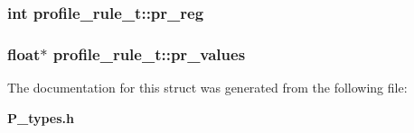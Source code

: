 \subsubsection{\setlength{\rightskip}{0pt plus 5cm}int profile\_\-rule\_\-t::pr\_\-reg}\label{structprofile__rule__t_m1}


\subsubsection{\setlength{\rightskip}{0pt plus 5cm}float$\ast$ profile\_\-rule\_\-t::pr\_\-values}\label{structprofile__rule__t_m3}




The documentation for this struct was generated from the following file:\begin{CompactItemize}
\item 
{\bf P\_\-types.h}\end{CompactItemize}
